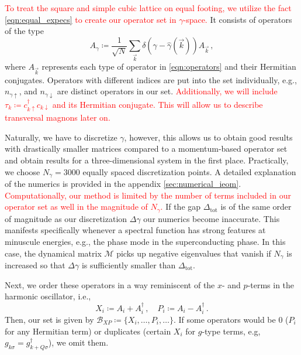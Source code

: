 \documentclass[
    reprint, 
    aps,
    preprintnumbers,
    twocolumn,
    prb,
    superscriptaddress
]{revtex4-2}
\newcommand{\vk}{\vec{k}}
\newcommand{\up}{\uparrow}
\newcommand{\down}{\downarrow}
\newcommand{\mM}{\mathcal{M}}
\begin{document}
\textcolor{red}{To treat the square and simple cubic lattice on equal footing, we utilize the fact \eqref{eqn:equal_expecs} to create our operator set in $\gamma$-space.}
It consists of operators of the type
\begin{equation}
    \label{eqn:ieom_basis_operator}
    A_\gamma \coloneqq \frac{1}{\sqrt{N}} \sum_{\vk} \delta (\gamma - \hat{\gamma}( \vk )) A_{\vk}\,,
\end{equation}
where $A_{\vk}$ represents each type of operator in \eqref{eqn:operators} and their Hermitian conjugates.
Operators with different indices are put into the set individually, e.g., $n_{\gamma \up}$, and $n_{\gamma \down}$ are distinct operators in our set.
\textcolor{red}{Additionally, we will include $\tau_{k} \coloneqq c_{k \uparrow}^\dagger c_{k \downarrow}$ and its Hermitian conjugate.
This will allow us to describe transversal magnons later on.}

Naturally, we have to discretize $\gamma$, 
however, this allows us to obtain good results with drastically smaller matrices compared to a momentum-based operator set and obtain results for a three-dimensional system in the first place.
Practically, we choose $N_\gamma = 3000$ equally spaced discretization points.
A detailed explanation of the numerics is provided in the appendix \ref{sec:numerical_ieom}.
\textcolor{red}{Computationally, our method is limited by the number of terms included in our operator set as well in the magnitude of $N_\gamma$.}
If the gap $\Delta_\text{tot}$ is of the same order of magnitude as our discretization $\Delta \gamma$ our numerics become inaccurate.
This manifests specifically whenever a spectral function has strong features at minuscule energies, e.g., the phase mode in the superconducting phase.
In this case, the dynamical matrix $\mM$ picks up negative eigenvalues that vanish if $N_\gamma$ is increased so that $\Delta \gamma$ is sufficiently smaller than $\Delta_\text{tot}$.

Next, we order these operators in a way reminiscent of the $x$- and $p$-terms in the harmonic oscillator, i.e.,
\begin{equation}
    X_i \coloneqq  A_i + A_i^\dagger\,,\quad P_i \coloneqq  A_i - A_i^\dagger\,.
\end{equation}
Then, our set is given by $\mathcal{B}_{XP} \coloneqq \{ X_i, \ldots, P_i, \ldots \}$.
If some operators would be 0 ($P_i$ for any Hermitian term) or duplicates (certain $X_i$ for $g$-type terms, e.g, $g_{k\sigma} = g_{k+Q\sigma}^\dagger$), we omit them.
\end{document}
